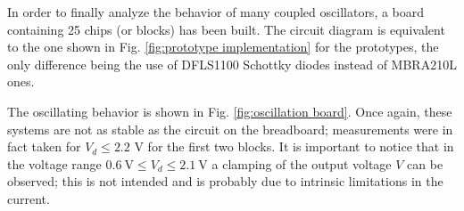 In order to finally analyze the behavior of many coupled
oscillators, a board containing 25 chips (or blocks) has been built.
The circuit diagram is equivalent to the one shown in Fig.
\ref{fig:prototype implementation} for the prototypes, the only
difference being the use of DFLS1100 Schottky diodes instead of
MBRA210L ones.

The oscillating behavior is shown in Fig.
\ref{fig:oscillation board}. Once again, these systems are not as
stable as the circuit on the breadboard; measurements were in fact
taken for $V_d \leq 2.2$ V for the first two blocks. It is important to notice
that in the voltage range $0.6~\text{V} \leq V_d \leq 2.1~\text{V}$
a clamping of the output voltage $V$ can be observed; this is not
intended and is probably due to intrinsic limitations in the current.

